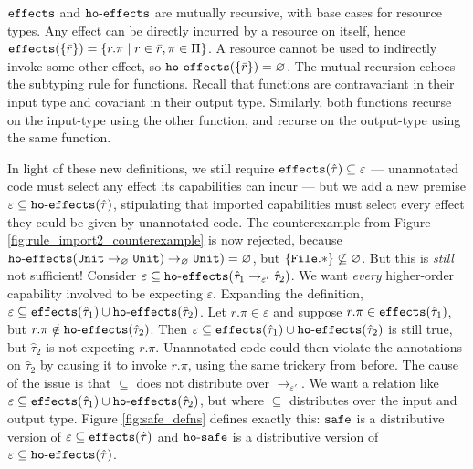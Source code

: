 $\mathtt{effects}$ and $\mathtt{ho \hbox{-} effects}$ are mutually recursive, with base cases for resource types. Any effect can be directly incurred by a resource on itself, hence $\mathtt{effects}(\{ \bar r \}) = \{ r.\pi \mid r \in \bar r, \pi \in \Pi \}$. A resource cannot be used to indirectly invoke some other effect, so $\mathtt{ho \hbox{-} effects}(\{ \bar r \}) = \varnothing$. The mutual recursion echoes the subtyping rule for functions. Recall that functions are contravariant in their input type and covariant in their output type. Similarly, both functions recurse on the input-type using the other function, and recurse on the output-type using the same function.

In light of these new definitions, we still require $\mathtt{effects}(\hat \tau) \subseteq \varepsilon$ --- unannotated code must select any effect its capabilities can incur --- but we add a new premise $\varepsilon \subseteq \mathtt{ho \hbox{-} effects}(\hat \tau)$, stipulating that imported capabilities must select every effect they could be given by unannotated code. The counterexample from Figure \ref{fig:rule_import2_counterexample} is now rejected, because $\mathtt{ho \hbox{-} effects}(\mathtt{Unit} \rightarrow_{\varnothing} \mathtt{Unit}) \rightarrow_{\varnothing} \mathtt{Unit}) = \varnothing$, but $\{ \mathtt{File.*} \} \not\subseteq \varnothing$. But this is \textit{still} not sufficient! Consider $\varepsilon \subseteq \mathtt{ho \hbox{-} effects}( \hat \tau_1 \rightarrow_{\varepsilon'} \hat \tau_2 )$. We want \textit{every} higher-order capability involved to be expecting $\varepsilon$. Expanding the definition, $\varepsilon \subseteq \mathtt{effects}(\hat \tau_1) \cup \mathtt{ho \hbox{-} effects}(\hat \tau_2)$. Let $r.\pi \in \varepsilon$ and suppose $r.\pi \in \mathtt{effects}(\hat \tau_1)$, but $r.\pi \notin \mathtt{ho \hbox{-} effects}(\hat \tau_2)$. Then $\varepsilon \subseteq \mathtt{effects}(\hat \tau_1) \cup \mathtt{ho \hbox{-} effects}(\hat \tau_2)$ is still true, but $\hat \tau_2$ is not expecting $r.\pi$. Unannotated code could then violate the annotations on $\hat \tau_2$ by causing it to invoke $r.\pi$, using the same trickery from before. The cause of the issue is that $\subseteq$ does not distribute over $\rightarrow_{\varepsilon'}$. We want a relation like $\varepsilon \subseteq \mathtt{effects}(\hat \tau_1) \cup \mathtt{ho \hbox{-} effects}(\hat \tau_2)$, but where $\subseteq$ distributes over the input and output type. Figure \ref{fig:safe_defns} defines exactly this: $\mathtt{safe}$ is a distributive version of $\varepsilon \subseteq \mathtt{effects}(\hat \tau)$ and $\mathtt{ho \hbox{-} safe}$ is a distributive version of $\varepsilon \subseteq \mathtt{ho \hbox{-} effects}(\hat \tau)$.


